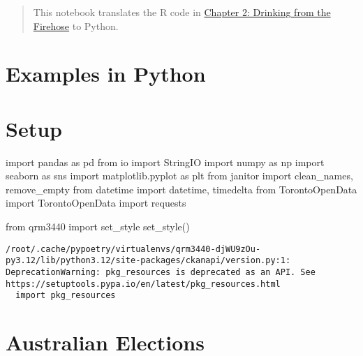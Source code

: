 \documentclass[
  letterpaper,
  DIV=11,
  numbers=noendperiod]{scrreprt}
\newenvironment{Shaded}{\begin{snugshade}}{\end{snugshade}}
\newcommand{\ImportTok}[1]{\textcolor[rgb]{0.00,0.46,0.62}{#1}}
\newcommand{\NormalTok}[1]{\textcolor[rgb]{0.00,0.23,0.31}{#1}}
\begin{document}
\begin{quote}
This notebook translates the R code in
\href{https://tellingstorieswithdata.com/02-drinking_from_a_fire_hose.html}{Chapter
2: Drinking from the Firehose} to Python.
\end{quote}

\hypertarget{examples-in-python}{%
\section{Examples in Python}\label{examples-in-python}}

\hypertarget{setup}{%
\section{Setup}\label{setup}}

\begin{Shaded}
\begin{Highlighting}[]
\ImportTok{import}\NormalTok{ pandas }\ImportTok{as}\NormalTok{ pd}
\ImportTok{from}\NormalTok{ io }\ImportTok{import}\NormalTok{ StringIO}
\ImportTok{import}\NormalTok{ numpy }\ImportTok{as}\NormalTok{ np}
\ImportTok{import}\NormalTok{ seaborn }\ImportTok{as}\NormalTok{ sns}
\ImportTok{import}\NormalTok{ matplotlib.pyplot }\ImportTok{as}\NormalTok{ plt}
\ImportTok{from}\NormalTok{ janitor }\ImportTok{import}\NormalTok{ clean\_names, remove\_empty}
\ImportTok{from}\NormalTok{ datetime }\ImportTok{import}\NormalTok{ datetime, timedelta}
\ImportTok{from}\NormalTok{ TorontoOpenData }\ImportTok{import}\NormalTok{ TorontoOpenData}
\ImportTok{import}\NormalTok{ requests}

\ImportTok{from}\NormalTok{ qrm3440 }\ImportTok{import}\NormalTok{ set\_style}
\NormalTok{set\_style()}
\end{Highlighting}
\end{Shaded}

\begin{verbatim}
/root/.cache/pypoetry/virtualenvs/qrm3440-djWU9zOu-py3.12/lib/python3.12/site-packages/ckanapi/version.py:1: DeprecationWarning: pkg_resources is deprecated as an API. See https://setuptools.pypa.io/en/latest/pkg_resources.html
  import pkg_resources
\end{verbatim}

\hypertarget{australian-elections}{%
\section{Australian Elections}\label{australian-elections}}
\end{document}
